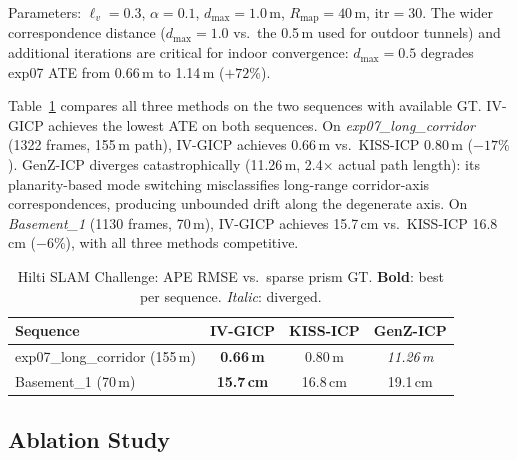 \documentclass[letterpaper, 10pt, conference]{ieeeconf}
\begin{document}
Parameters: $\ell_v{=}0.3$, $\alpha{=}0.1$, $d_{\max}{=}1.0$\,m,
$R_{\mathrm{map}}{=}40$\,m, $\mathrm{itr}{=}30$.
The wider correspondence distance ($d_{\max}{=}1.0$ vs.\ the 0.5\,m used for outdoor
tunnels) and additional iterations are critical for indoor convergence:
$d_{\max}{=}0.5$ degrades exp07 ATE from 0.66\,m to 1.14\,m ($+72\%$).

Table~\ref{tab:hilti} compares all three methods on the two sequences with
available GT.
IV-GICP achieves the lowest ATE on both sequences.
On \textit{exp07\_long\_corridor} (1322 frames, 155\,m path), IV-GICP achieves
0.66\,m vs.\ KISS-ICP 0.80\,m ($-17\%$).
GenZ-ICP diverges catastrophically (11.26\,m, 2.4$\times$ actual path length):
its planarity-based mode switching misclassifies long-range corridor-axis
correspondences, producing unbounded drift along the degenerate axis.
On \textit{Basement\_1} (1130 frames, 70\,m), IV-GICP achieves
15.7\,cm vs.\ KISS-ICP 16.8\,cm ($-6\%$), with all three methods competitive.

\begin{table}[h]
\centering
\caption{Hilti SLAM Challenge: APE RMSE vs.\ sparse prism GT.
  \textbf{Bold}: best per sequence. \textit{Italic}: diverged.}
\label{tab:hilti}
\begin{tabular}{lccc}
\toprule
Sequence & IV-GICP & KISS-ICP & GenZ-ICP \\
\midrule
exp07\_long\_corridor (155\,m) & \textbf{0.66\,m} & 0.80\,m & \textit{11.26\,m} \\
Basement\_1 (70\,m)           & \textbf{15.7\,cm} & 16.8\,cm & 19.1\,cm \\
\bottomrule
\end{tabular}
\end{table}

\subsection{Ablation Study}\label{sec:ablation}
\end{document}
